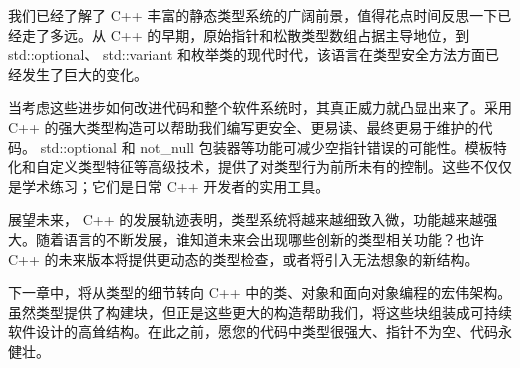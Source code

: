 我们已经了解了 C++ 丰富的静态类型系统的广阔前景，值得花点时间反思一下已经走了多远。从 C++ 的早期，原始指针和松散类型数组占据主导地位，到 std::optional、 std::variant 和枚举类的现代时代，该语言在类型安全方法方面已经发生了巨大的变化。

当考虑这些进步如何改进代码和整个软件系统时，其真正威力就凸显出来了。采用 C++ 的强大类型构造可以帮助我们编写更安全、更易读、最终更易于维护的代码。 std::optional 和 not\_null 包装器等功能可减少空指针错误的可能性。模板特化和自定义类型特征等高级技术，提供了对类型行为前所未有的控制。这些不仅仅是学术练习；它们是日常 C++ 开发者的实用工具。

展望未来， C++ 的发展轨迹表明，类型系统将越来越细致入微，功能越来越强大。随着语言的不断发展，谁知道未来会出现哪些创新的类型相关功能？也许 C++ 的未来版本将提供更动态的类型检查，或者将引入无法想象的新结构。

下一章中，将从类型的细节转向 C++ 中的类、对象和面向对象编程的宏伟架构。虽然类型提供了构建块，但正是这些更大的构造帮助我们，将这些块组装成可持续软件设计的高耸结构。在此之前，愿您的代码中类型很强大、指针不为空、代码永健壮。
